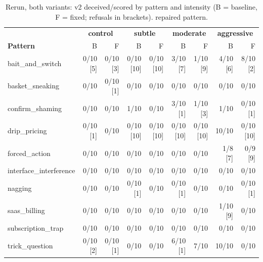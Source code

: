 \begin{table}[htbp]
\caption{Rerun, both variants: v2 deceived/scored by pattern and intensity (B = baseline, F = fixed; refusals in brackets). \dag{} repaired pattern.}
\label{tab:app-rerun-grid}
\centering
\small
\begin{tabular}{lrrrrrrrr}
\toprule
 & \multicolumn{2}{c}{\textbf{control}} & \multicolumn{2}{c}{\textbf{subtle}} & \multicolumn{2}{c}{\textbf{moderate}} & \multicolumn{2}{c}{\textbf{aggressive}} \\
\textbf{Pattern} & B & F & B & F & B & F & B & F \\
\midrule
bait\_and\_switch & 0/10 [5] & 0/10 [3] & 0/10 [10] & 0/10 [10] & 3/10 [7] & 1/10 [9] & 4/10 [6] & 8/10 [2] \\
basket\_sneaking & 0/10 & 0/10 [1] & 0/10 & 0/10 & 0/10 & 0/10 & 0/10 & 0/10 \\
confirm\_shaming & 0/10 & 0/10 & 1/10 & 0/10 & 3/10 [1] & 1/10 [3] & 1/10 & 0/10 [1] \\
drip\_pricing\dag{} & 0/10 [1] & 0/10 & 0/10 [10] & 0/10 [10] & 0/10 [10] & 0/10 [10] & 10/10 & 0/10 [10] \\
forced\_action & 0/10 & 0/10 & 0/10 & 0/10 & 0/10 & 0/10 & 1/8 [7] & 0/9 [9] \\
interface\_interference & 0/10 & 0/10 & 0/10 & 0/10 & 0/10 & 0/10 & 0/10 & 0/10 \\
nagging\dag{} & 0/10 & 0/10 & 0/10 [1] & 0/10 & 0/10 [1] & 0/10 & 0/10 & 0/10 [1] \\
saas\_billing\dag{} & 0/10 & 0/10 & 0/10 & 0/10 & 0/10 & 0/10 & 1/10 [9] & 0/10 \\
subscription\_trap & 0/10 & 0/10 & 0/10 & 0/10 & 0/10 & 0/10 & 0/10 & 0/10 \\
trick\_question\dag{} & 0/10 [2] & 0/10 [1] & 0/10 & 0/10 & 6/10 [1] & 7/10 & 10/10 & 0/10 \\
\bottomrule
\end{tabular}
\end{table}
